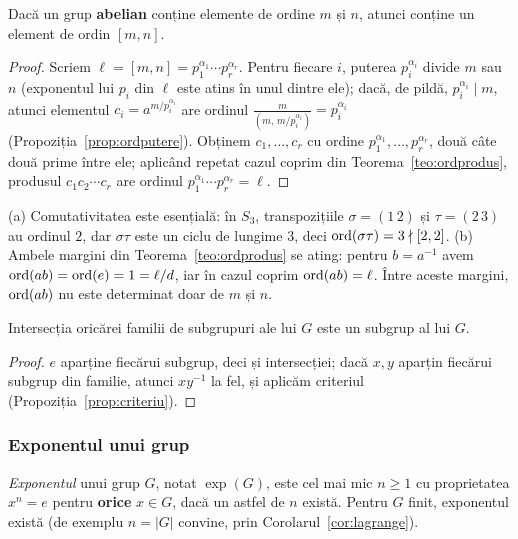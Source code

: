 \begin{corolar}\label{cor:lcm}
Dacă un grup \textbf{abelian} conține elemente de ordine $m$ și $n$, atunci conține un element de ordin $[m,n]$.
\end{corolar}

\begin{proof}
Scriem $\ell=[m,n]=p_1^{\alpha_1}\cdots p_r^{\alpha_r}$. Pentru fiecare $i$, puterea $p_i^{\alpha_i}$ divide $m$ sau $n$ (exponentul lui $p_i$ din $\ell$ este atins în unul dintre ele); dacă, de pildă, $p_i^{\alpha_i}\mid m$, atunci elementul $c_i=a^{m/p_i^{\alpha_i}}$ are ordinul $\frac{m}{(m,\,m/p_i^{\alpha_i})}=p_i^{\alpha_i}$ (Propoziția~\ref{prop:ordputere}). Obținem $c_1,\dots,c_r$ cu ordine $p_1^{\alpha_1},\dots,p_r^{\alpha_r}$, două câte două prime între ele; aplicând repetat cazul coprim din Teorema~\ref{teo:ordprodus}, produsul $c_1c_2\cdots c_r$ are ordinul $p_1^{\alpha_1}\cdots p_r^{\alpha_r}=\ell$.
\end{proof}

\begin{observatie}
(a) Comutativitatea este esențială: în $S_3$, transpozițiile $\sigma=(1\,2)$ și $\tau=(2\,3)$ au ordinul $2$, dar $\sigma\tau$ este un ciclu de lungime $3$, deci $\operatorname{ord}(\sigma\tau)=3\nmid[2,2]$. (b) Ambele margini din Teorema~\ref{teo:ordprodus} se ating: pentru $b=a^{-1}$ avem $\operatorname{ord}(ab)=\operatorname{ord}(e)=1=\ell/d$, iar în cazul coprim $\operatorname{ord}(ab)=\ell$. Între aceste margini, $\operatorname{ord}(ab)$ nu este determinat doar de $m$ și $n$.
\end{observatie}

\begin{propozitie}\label{prop:intersectie}
Intersecția oricărei familii de subgrupuri ale lui $G$ este un subgrup al lui $G$.
\end{propozitie}

\begin{proof}
$e$ aparține fiecărui subgrup, deci și intersecției; dacă $x,y$ aparțin fiecărui subgrup din familie, atunci $xy^{-1}$ la fel, și aplicăm criteriul (Propoziția~\ref{prop:criteriu}).
\end{proof}

\subsubsection*{Exponentul unui grup}

\begin{definitie}
\emph{Exponentul} unui grup $G$, notat $\exp(G)$, este cel mai mic $n\ge1$ cu proprietatea $x^n=e$ pentru \textbf{orice} $x\in G$, dacă un astfel de $n$ există. Pentru $G$ finit, exponentul există (de exemplu $n=|G|$ convine, prin Corolarul~\ref{cor:lagrange}).
\end{definitie}


